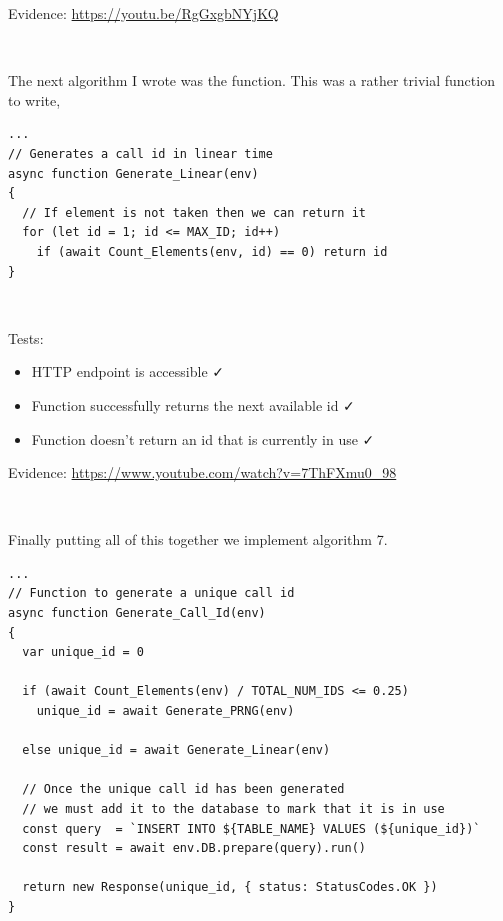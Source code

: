 {\sffamily Evidence:} \url{https://youtu.be/RgGxgbNYjKQ}\\ \vspace{0.2cm}

{\color{gray} \hrulefill} \\ \vspace{0.2cm}

The next algorithm I wrote was the 
function. This was a rather trivial function to write,

\begin{verbatim}
...
// Generates a call id in linear time
async function Generate_Linear(env)
{
  // If element is not taken then we can return it
  for (let id = 1; id <= MAX_ID; id++)
    if (await Count_Elements(env, id) == 0) return id
}
\end{verbatim}

{\color{gray} \hrulefill} \\ \vspace{0.2cm}

{\sffamily Tests:}

\begin{itemize}
  \item HTTP endpoint is accessible \faCheck \\
  \item Function successfully returns the next available id \faCheck \\
  \item Function doesn't return an id that is currently in use \faCheck \\
\end{itemize}

{\sffamily Evidence:} \url{https://www.youtube.com/watch?v=7ThFXmu0_98}\\ \vspace{0.2cm}

{\color{gray} \hrulefill} \\ \vspace{0.2cm}

Finally putting all of this together we implement algorithm 7.

\begin{verbatim}
...
// Function to generate a unique call id
async function Generate_Call_Id(env)
{
  var unique_id = 0

  if (await Count_Elements(env) / TOTAL_NUM_IDS <= 0.25)
    unique_id = await Generate_PRNG(env)

  else unique_id = await Generate_Linear(env)

  // Once the unique call id has been generated
  // we must add it to the database to mark that it is in use
  const query  = `INSERT INTO ${TABLE_NAME} VALUES (${unique_id})`
  const result = await env.DB.prepare(query).run()

  return new Response(unique_id, { status: StatusCodes.OK })
}
\end{verbatim}

